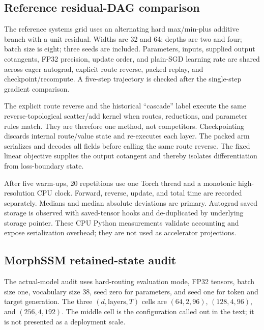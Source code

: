 \subsection{Reference residual-DAG comparison}

The reference systems grid uses an alternating hard max/min-plus additive
branch with a unit residual.  Widths are 32 and 64; depths are two and four;
batch size is eight; three seeds are included.  Parameters, inputs, supplied
output cotangents, FP32 precision, update order, and plain-SGD learning rate are
shared across eager autograd, explicit route reverse, packed replay, and
checkpoint/recompute.  A five-step trajectory is checked after the single-step
gradient comparison.

The explicit route reverse and the historical ``cascade'' label execute the
same reverse-topological scatter/add kernel when routes, reductions, and
parameter rules match.  They are therefore one method, not competitors.
Checkpointing discards internal route/value state and re-executes each layer.
The packed arm serializes and decodes all fields before calling the same route
reverse.  The fixed linear objective supplies the output cotangent and thereby
isolates differentiation from loss-boundary state.

After five warm-ups, 20 repetitions use one Torch thread and a monotonic
high-resolution CPU clock.  Forward, reverse, update, and total time are
recorded separately.  Medians and median absolute deviations are primary.
Autograd saved storage is observed with saved-tensor hooks and de-duplicated by
underlying storage pointer.  These CPU Python measurements validate accounting
and expose serialization overhead; they are not used as accelerator
projections.

\subsection{MorphSSM retained-state audit}

The actual-model audit uses hard-routing evaluation mode, FP32 tensors, batch
size one, vocabulary size 38, seed zero for parameters, and seed one for token
and target generation.  The three $(d,\text{layers},T)$ cells are
$(64,2,96)$, $(128,4,96)$, and $(256,4,192)$.  The middle cell is the
configuration called out in the text; it is not presented as a deployment
scale.

